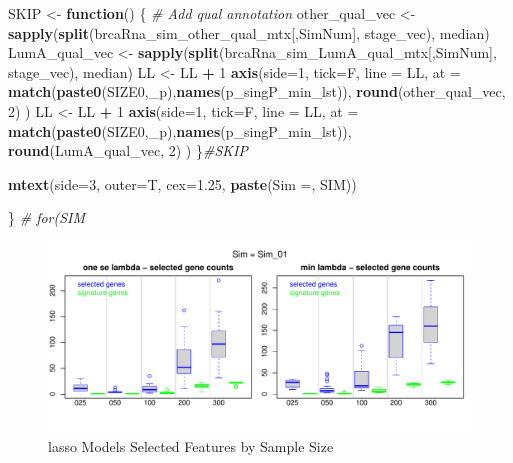 \documentclass[
]{book}
\newenvironment{Shaded}{\begin{snugshade}}{\end{snugshade}}
\newcommand{\CommentTok}[1]{\textcolor[rgb]{0.56,0.35,0.01}{\textit{#1}}}
\newcommand{\ControlFlowTok}[1]{\textcolor[rgb]{0.13,0.29,0.53}{\textbf{#1}}}
\newcommand{\DataTypeTok}[1]{\textcolor[rgb]{0.13,0.29,0.53}{#1}}
\newcommand{\DecValTok}[1]{\textcolor[rgb]{0.00,0.00,0.81}{#1}}
\newcommand{\FloatTok}[1]{\textcolor[rgb]{0.00,0.00,0.81}{#1}}
\newcommand{\KeywordTok}[1]{\textcolor[rgb]{0.13,0.29,0.53}{\textbf{#1}}}
\newcommand{\NormalTok}[1]{#1}
\newcommand{\OperatorTok}[1]{\textcolor[rgb]{0.81,0.36,0.00}{\textbf{#1}}}
\newcommand{\StringTok}[1]{\textcolor[rgb]{0.31,0.60,0.02}{#1}}
\begin{document}
\begin{Shaded}
\begin{Highlighting}[]
\NormalTok{SKIP  <{-}}\StringTok{ }\ControlFlowTok{function}\NormalTok{() \{}
\CommentTok{\# Add qual annotation}
\NormalTok{other\_qual\_vec <{-}}\StringTok{ }\KeywordTok{sapply}\NormalTok{(}\KeywordTok{split}\NormalTok{(brcaRna\_sim\_other\_qual\_mtx[,SimNum], stage\_vec), median)}
\NormalTok{LumA\_qual\_vec <{-}}\StringTok{ }\KeywordTok{sapply}\NormalTok{(}\KeywordTok{split}\NormalTok{(brcaRna\_sim\_LumA\_qual\_mtx[,SimNum], stage\_vec), median)}
\NormalTok{LL <{-}}\StringTok{ }\NormalTok{LL }\OperatorTok{+}\StringTok{ }\DecValTok{1}
\KeywordTok{axis}\NormalTok{(}\DataTypeTok{side=}\DecValTok{1}\NormalTok{, }\DataTypeTok{tick=}\NormalTok{F, }\DataTypeTok{line =}\NormalTok{ LL,}
  \DataTypeTok{at =}  \KeywordTok{match}\NormalTok{(}\KeywordTok{paste0}\NormalTok{(SIZE0,}\StringTok{\textquotesingle{}\_p\textquotesingle{}}\NormalTok{),}\KeywordTok{names}\NormalTok{(p\_singP\_min\_lst)),}
  \KeywordTok{round}\NormalTok{(other\_qual\_vec, }\DecValTok{2}\NormalTok{)}
\NormalTok{ )}
\NormalTok{LL <{-}}\StringTok{ }\NormalTok{LL }\OperatorTok{+}\StringTok{ }\DecValTok{1}
\KeywordTok{axis}\NormalTok{(}\DataTypeTok{side=}\DecValTok{1}\NormalTok{, }\DataTypeTok{tick=}\NormalTok{F, }\DataTypeTok{line =}\NormalTok{ LL,}
  \DataTypeTok{at =}  \KeywordTok{match}\NormalTok{(}\KeywordTok{paste0}\NormalTok{(SIZE0,}\StringTok{\textquotesingle{}\_p\textquotesingle{}}\NormalTok{),}\KeywordTok{names}\NormalTok{(p\_singP\_min\_lst)),}
  \KeywordTok{round}\NormalTok{(LumA\_qual\_vec, }\DecValTok{2}\NormalTok{)}
\NormalTok{ )}
\NormalTok{\}}\CommentTok{\#SKIP}

\KeywordTok{mtext}\NormalTok{(}\DataTypeTok{side=}\DecValTok{3}\NormalTok{, }\DataTypeTok{outer=}\NormalTok{T, }\DataTypeTok{cex=}\FloatTok{1.25}\NormalTok{, }\KeywordTok{paste}\NormalTok{(}\StringTok{\textquotesingle{}Sim =\textquotesingle{}}\NormalTok{,  SIM))}

\NormalTok{\} }\CommentTok{\# for(SIM}
\end{Highlighting}
\end{Shaded}

\begin{figure}
\centering
\includegraphics{Static/figures/brca-rnaseq-lasso-simRes-features-bySim-1.pdf}
\caption{\label{fig:brca-rnaseq-lasso-simRes-features-bySim}lasso Models Selected Features by Sample Size}
\end{figure}
\end{document}
